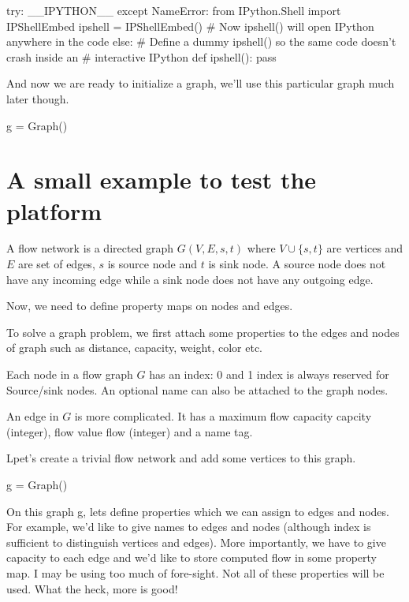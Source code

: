 \documentclass[10pt,a4paper]{article}%
\begin{document}
\nwenddocs{}\plusendmoddef\nwstartdeflinemarkup\nwenddeflinemarkup
try:
    __IPYTHON__
except NameError:
    from IPython.Shell import IPShellEmbed
    ipshell = IPShellEmbed()
    # Now ipshell() will open IPython anywhere in the code
else:
    # Define a dummy ipshell() so the same code doesn't crash inside an
    # interactive IPython
    def ipshell(): pass

\nwendcode{}And now we are ready to initialize a graph, we'll use this particular graph
much later though.

\nwenddocs{}\endmoddef\nwstartdeflinemarkup\nwenddeflinemarkup
g = Graph()

\nwendcode{}\section{A small example to test the platform}

    A flow network is a directed graph $G(V,E,s,t)$ where $V\cup \{s,t\}$ are
    vertices and $E$ are set of edges, $s$ is source node and $t$ is sink node.
    A source node does not have any incoming edge while a sink node does not
    have any outgoing edge.

    Now, we need to define property maps on nodes and edges.

    To solve a graph problem, we first attach some properties to the edges and
    nodes of graph such as distance, capacity, weight, color etc. 

    Each node in a flow graph $G$ has an index: 0 and 1 index is always reserved
    for Source/sink nodes.  An optional {\Tt{}name\nwendquote} can also be attached to the
    graph nodes. 

    An edge in $G$ is more complicated. It has a maximum flow capacity
    {\Tt{}capcity\nwendquote} (integer), flow value {\Tt{}flow\nwendquote} (integer) and a name {\Tt{}tag\nwendquote}.

    Lpet's create a trivial flow network and add some vertices to this graph.

\nwenddocs{}\plusendmoddef\nwstartdeflinemarkup\nwenddeflinemarkup
g = Graph()

\nwendcode{}  On this graph {\Tt{}g\nwendquote}, lets define properties which we can assign to edges
    and nodes. For example, we'd like to give names to edges and nodes (although
    index is sufficient to distinguish vertices and edges). More importantly, we
    have to give capacity to each edge and we'd like to store computed flow in
    some property map. I may be using too much of fore-sight. Not all of these
    properties will be used. What the heck, more is good!
\end{document}
